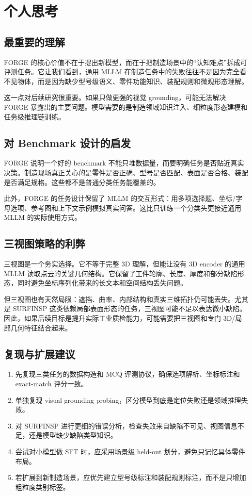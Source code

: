 \section{个人思考}

\subsection{最重要的理解}

FORGE 的核心价值不在于提出新模型，而在于把制造场景中的“认知难点”拆成可评测任务。它让我们看到，通用 MLLM 在制造任务中的失败往往不是因为完全看不见物体，而是因为缺少型号级语义、零件功能知识、装配规则和微观形态理解。

这一点对后续研究很重要。如果只做更强的视觉 grounding，可能无法解决 FORGE 暴露出的主要问题。模型需要的是制造领域知识注入、细粒度形态建模和任务级推理链训练。

\subsection{对 Benchmark 设计的启发}

FORGE 说明一个好的 benchmark 不能只堆数据量，而要明确任务是否贴近真实决策。制造现场真正关心的是零件是否正确、型号是否匹配、表面是否合格、装配是否满足规格。这些都不是普通分类任务能覆盖的。

此外，FORGE 的任务设计保留了 MLLM 的交互形式：用多项选择题、坐标/字母选项、参考图和上下文示例模拟真实问答。这比只训练一个分类头更接近通用 MLLM 的实际使用方式。

\subsection{三视图策略的利弊}

三视图是一个务实选择。它不等于完整 3D 理解，但能让没有 3D encoder 的通用 MLLM 读取点云的关键几何结构。它保留了工件轮廓、长度、厚度和部分缺陷形态，同时避免坐标序列化带来的长文本和空间结构丢失问题。

但三视图也有天然局限：遮挡、曲率、内部结构和真实三维拓扑仍可能丢失。尤其是 SURFINSP 这类依赖局部表面形态的任务，三视图可能不足以表达微小缺陷。因此，如果后续目标是提升实际工业质检能力，可能需要把三视图和专门 3D/局部几何特征结合起来。

\subsection{复现与扩展建议}

\begin{enumerate}
    \item 先复现三类任务的数据构造和 MCQ 评测协议，确保选项解析、坐标标注和 exact-match 评分一致。
    \item 单独复现 visual grounding probing，区分模型到底是定位失败还是领域推理失败。
    \item 对 SURFINSP 进行更细的错误分析，检查失败来自缺陷不可见、视图信息不足，还是模型缺少缺陷类型知识。
    \item 尝试对小模型做 SFT 时，应采用场景级 held-out 划分，避免只记忆具体零件布局。
    \item 若扩展到新制造场景，应优先建立型号级标注和装配规则标注，而不是只增加粗粒度类别标签。
\end{enumerate}

